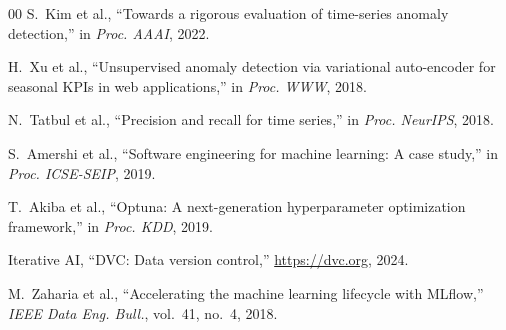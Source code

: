 \documentclass[conference]{IEEEtran}
\begin{document}
\begin{thebibliography}{00}
S.~Kim et al.,
``Towards a rigorous evaluation of time-series anomaly detection,''
in \textit{Proc. AAAI}, 2022.

H.~Xu et al.,
``Unsupervised anomaly detection via variational auto-encoder for seasonal
KPIs in web applications,''
in \textit{Proc. WWW}, 2018.

N.~Tatbul et al.,
``Precision and recall for time series,''
in \textit{Proc. NeurIPS}, 2018.

S.~Amershi et al.,
``Software engineering for machine learning: A case study,''
in \textit{Proc. ICSE-SEIP}, 2019.

T.~Akiba et al.,
``Optuna: A next-generation hyperparameter optimization framework,''
in \textit{Proc. KDD}, 2019.

{Iterative AI},
``DVC: Data version control,''
\url{https://dvc.org}, 2024.

M.~Zaharia et al.,
``Accelerating the machine learning lifecycle with MLflow,''
\textit{IEEE Data Eng. Bull.}, vol.~41, no.~4, 2018.

\end{thebibliography}
\end{document}
